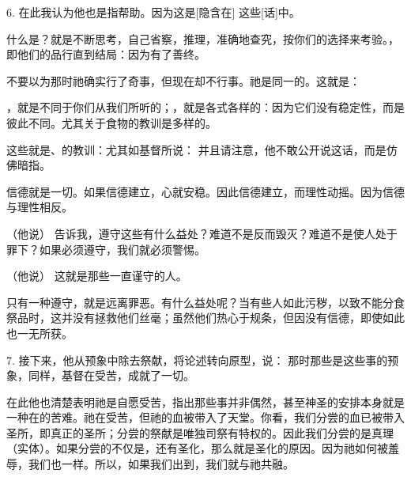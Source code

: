 6. 在此我认为他也是指帮助。因为这是[隐含在] 这些[话]中。\par

 什么是？就是不断思考，自己省察，推理，准确地查究，按你们的选择来考验。，即他们的品行直到结局：因为有了善终。\par

 不要以为那时祂确实行了奇事，但现在却不行事。祂是同一的。这就是：\par

 ，就是不同于你们从我们所听的；，就是各式各样的：因为它们没有稳定性，而是彼此不同。尤其关于食物的教训是多样的。\par

 这些就是、的教训：尤其如基督所说：  并且请注意，他不敢公开说这话，而是仿佛暗指。\par

信德就是一切。如果信德建立，心就安稳。因此信德建立，而理性动摇。因为信德与理性相反。\par

（他说） 告诉我，遵守这些有什么益处？难道不是反而毁灭？难道不是使人处于罪下？如果必须遵守，我们就必须警惕。\par

（他说） 这就是那些一直谨守的人。\par

只有一种遵守，就是远离罪恶。有什么益处呢？当有些人如此污秽，以致不能分食祭品时，这并没有拯救他们丝毫；虽然他们热心于规条，但因没有信德，即使如此也一无所获。\par

7. 接下来，他从预象中除去祭献，将论述转向原型，说： 那时那些是这些事的预象，同样，基督在受苦，成就了一切。\par

在此他也清楚表明祂是自愿受苦，指出那些事并非偶然，甚至神圣的安排本身就是一种在的苦难。祂在受苦，但祂的血被带入了天堂。你看，我们分尝的血已被带入圣所，即真正的圣所；分尝的祭献是唯独司祭有特权的。因此我们分尝的是真理（实体）。如果分尝的不仅是，还有圣化，那么就是圣化的原因。因为祂如何被羞辱，我们也一样。所以，如果我们出到，我们就与祂共融。\par


